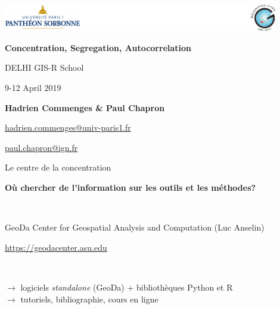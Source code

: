 \graphicspath{{IMAGE/}}

\begin{frame}

\includegraphics[width=12cm]{Logos.pdf}

\vfill

\begin{center}

\vspace*{1.5cm}

\LARGE
\textbf{Concentration, Segregation, Autocorrelation}

\vspace*{1.5cm}
 DELHI GIS-R School


\large
9-12 April 2019

\vspace*{1.5cm}


\textbf{Hadrien Commenges \& Paul Chapron}

{\small

\vspace*{0.1cm}

\url{hadrien.commenges@univ-paris1.fr}

\url{paul.chapron@ign.fr}
}

\end{center}

\end{frame}

\begin{frame}{Le centre de la concentration}

\textbf{Où chercher de l'information sur les outils et les méthodes?}

~

GeoDa Center for Geospatial Analysis and Computation (Luc Anselin)

\url{https://geodacenter.asu.edu}

~

$\rightarrow$ logiciels \emph{standalone} (GeoDa) + bibliothèques Python et R \\
$\rightarrow$ tutoriels, bibliographie, cours en ligne


\end{frame}


